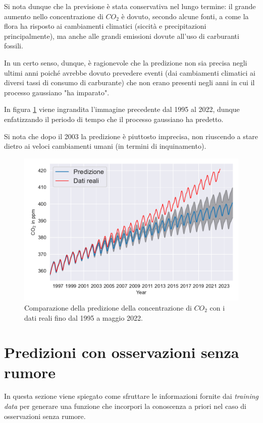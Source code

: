 \newpage

Si nota dunque che la previsione è stata conservativa nel lungo termine: il grande aumento nello concentrazione di $CO_2$ è dovuto, secondo alcune fonti, a come la flora ha risposto ai cambiamenti climatici (siccità e precipitazioni principalmente), ma anche alle grandi emissioni dovute all'uso di carburanti fossili.

In un certo senso, dunque, è ragionevole che la predizione non sia precisa negli ultimi anni poiché avrebbe dovuto prevedere eventi (dai cambiamenti climatici ai diversi tassi di consumo di carburante) che non erano presenti negli anni in cui il processo gaussiano "ha imparato".

In figura \ref{CO2_comparison_zoomed} viene ingrandita l'immagine precedente dal 1995 al 2022, dunque enfatizzando il periodo di tempo che il processo gaussiano ha predetto.

Si nota che dopo il 2003 la predizione è piuttosto imprecisa, non riuscendo a stare dietro ai veloci cambiamenti umani (in termini di inquinamento).  

\begin{figure}[h]
    \centering
    \includegraphics[width=1\textwidth]{images/Gaussian process/MaunaLoaPredictionZoom.pdf}
    \caption{Comparazione della predizione della concentrazione di $CO_2$ con i dati reali fino dal 1995 a maggio 2022.}
    \label{CO2_comparison_zoomed}
\end{figure}




\newpage



\section{Predizioni con osservazioni senza rumore}\label{regressioneGP}
In questa sezione viene spiegato come sfruttare le informazioni fornite dai \textit{training data} per generare una funzione che incorpori la conoscenza a priori nel caso di osservazioni senza rumore. \\


